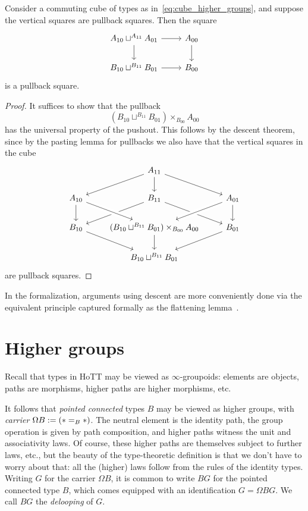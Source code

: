 \begin{thm}
Consider a commuting cube of types as in~\eqref{eq:cube_higher_groups}, and suppose the vertical squares are pullback squares.
Then the square
\begin{equation*}
\begin{tikzcd}
A_{10}\sqcup^{A_{11}} A_{01} \arrow[r] \arrow[d] & A_{00} \arrow[d] \\
B_{10}\sqcup^{B_{11}} B_{01} \arrow[r] & B_{00}
\end{tikzcd}
\end{equation*}
is a pullback square.
\end{thm}

\begin{proof}
It suffices to show that the pullback 
\begin{equation*}
(B_{10}\sqcup^{B_{11}} B_{01})\times_{B_{00}}A_{00}
\end{equation*}
has the universal property of the pushout. This follows by the descent theorem, since by the pasting lemma for pullbacks we also have that the vertical squares in the cube
\begin{equation*}
\begin{tikzcd}
& A_{11} \arrow[dl] \arrow[dr] \arrow[d] \\
A_{10} \arrow[d] & B_{11} \arrow[dl] \arrow[dr] & A_{01} \arrow[dl,crossing over] \arrow[d] \\
B_{10} \arrow[dr] & (B_{10}\sqcup^{B_{11}} B_{01})\times_{B_{00}}A_{00} \arrow[d] \arrow[from=ul,crossing over] & B_{01} \arrow[dl] \\
& B_{10}\sqcup^{B_{11}} B_{01}
\end{tikzcd}
\end{equation*}
are pullback squares.
\end{proof}
In the formalization, arguments using descent are more conveniently
done via the equivalent principle captured formally as the flattening
lemma~\cite[\S6.12]{hottbook}.

\section{Higher groups}
\label{sec:higher-groups}

Recall that types in HoTT may be viewed as $\infty$-groupoids:
elements are objects, paths are morphisms, higher paths are higher
morphisms, etc.

It follows that \emph{pointed connected} types $B$ may be viewed as higher
groups, with \emph{carrier} $\Omega B := (\ast =_B \ast)$.
The neutral element is the identity path,
the group operation is given by path composition,
and higher paths witness the unit and associativity laws.
Of course, these higher paths are themselves subject to further laws,
etc., but the beauty of the type-theoretic definition is
that we don't have to worry about that:
all the (higher) laws follow from the rules of the identity types.
Writing $G$ for the carrier $\Omega B$, it is common to write $BG$ for the pointed
connected type $B$, which comes equipped with an identification $G = \Omega BG$.
We call $BG$ the \emph{delooping} of $G$.

